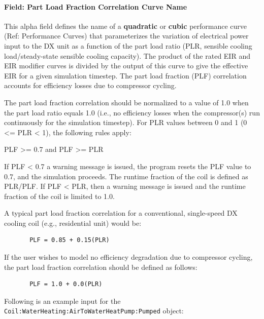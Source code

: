 \paragraph{Field: Part Load Fraction Correlation Curve Name}\label{field-part-load-fraction-correlation-curve-name-8}

This alpha field defines the name of a \textbf{quadratic} or \textbf{cubic} performance curve (Ref: Performance Curves) that parameterizes the variation of electrical power input to the DX unit as a function of the part load ratio (PLR, sensible cooling load/steady-state sensible cooling capacity). The product of the rated EIR and EIR modifier curves is divided by the output of this curve to give the effective EIR for a given simulation timestep. The part load fraction (PLF) correlation accounts for efficiency losses due to compressor cycling.

The part load fraction correlation should be normalized to a value of 1.0 when the part load ratio equals 1.0 (i.e., no efficiency losses when the compressor(s) run continuously for the simulation timestep). For PLR values between 0 and 1 (0 \textless{}= PLR \textless{} 1), the following rules apply:

PLF \textgreater{}= 0.7 and PLF \textgreater{}= PLR

If PLF \textless{} 0.7 a warning message is issued, the program resets the PLF value to 0.7, and the simulation proceeds. The runtime fraction of the coil is defined as PLR/PLF. If PLF \textless{} PLR, then a warning message is issued and the runtime fraction of the coil is limited to 1.0.

A typical part load fraction correlation for a conventional, single-speed DX cooling coil (e.g., residential unit) would be:

\begin{lstlisting}
       PLF = 0.85 + 0.15(PLR)
\end{lstlisting}

If the user wishes to model no efficiency degradation due to compressor cycling, the part load fraction correlation should be defined as follows:

\begin{lstlisting}
       PLF = 1.0 + 0.0(PLR)
\end{lstlisting}

Following is an example input for the \lstinline!Coil:WaterHeating:AirToWaterHeatPump:Pumped! object:

